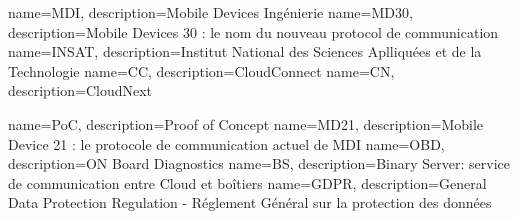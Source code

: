  {
	name=MDI,
	description={Mobile Devices Ingénierie}
}
 {
	name=MD30,
	description={Mobile Devices 30 : le nom du nouveau protocol de communication }
}
 {
	name=INSAT,
	description={Institut National des Sciences Aplliquées et de la Technologie}
}
 {
	name=CC,
	description={CloudConnect}
}
 {
	name=CN,
	description={CloudNext}
}

 {
	name=PoC,
	description={Proof of Concept}
}
 {
	name=MD21,
	description={Mobile Device 21 : le protocole de communication actuel de MDI}
}
 {
	name=OBD,
	description={ON Board Diagnostics}
}
 {
	name=BS,
	description={Binary Server: service de communication entre Cloud et boîtiers}
}
 {
	name=GDPR,
	description={General Data Protection Regulation - Réglement Général sur la protection des données\cite{gdpr} }
}
